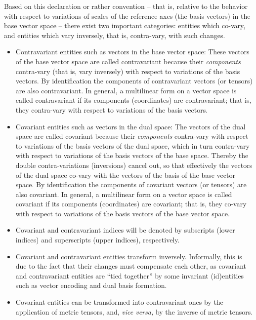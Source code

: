 Based on this declaration or rather convention
--
that is,
relative to the behavior with respect to variations of scales of the reference axes (the basis vectors) in the base vector space
--
there exist two important categories: entities which co-vary, and entities which vary inversely, that is, contra-vary, with such changes.
\begin{itemize}

\item  Contravariant entities such as vectors in the base vector space:
These vectors of the base vector space are called contravariant because
their {\em components} contra-vary (that is, vary inversely) with respect to variations of the basis vectors.
By identification the components of contravariant vectors (or tensors) are also contravariant.
In general, a multilinear form on a vector space is called contravariant if its components
(coordinates) are contravariant; that is, they contra-vary with respect to variations of the basis vectors.

\item
Covariant entities such as vectors in the dual space:
The vectors of the dual space are called covariant because
their {\em components} contra-vary with respect to variations of the basis vectors of the dual space,
which in turn contra-vary with respect to variations of the basis vectors of the base space.
Thereby the double contra-variations (inversions) cancel out,
so that effectively the vectors of the dual space co-vary with the vectors of the basis of the base vector space.
By identification the components of covariant vectors (or tensors) are also covariant.
In general, a multilinear form on a vector space is called covariant if its components
(coordinates) are covariant; that is, they co-vary with respect to variations of the basis vectors of the base vector space.

\item
Covariant and contravariant indices will be denoted by subscripts (lower indices) and superscripts (upper indices), respectively.

\item
Covariant and contravariant entities transform inversely.
Informally, this is due to the fact that their changes must compensate each other,
as covariant and contravariant entities are ``tied together'' by some invariant
(id)entities such as vector encoding and dual basis formation.

\item
Covariant entities can be transformed into contravariant ones
by the application of metric tensors,
and, {\it vice versa,} by the inverse of  metric tensors.
\end{itemize}



